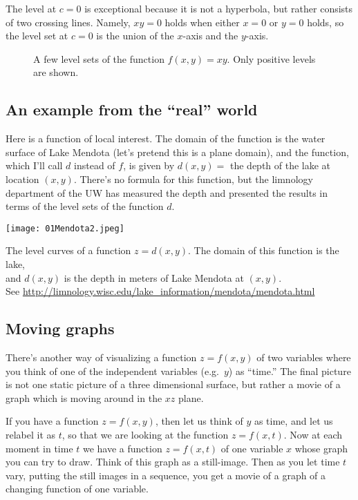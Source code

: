 The level at $c=0$ is exceptional because it is not a hyperbola, but
rather consists of two crossing lines.  Namely, $xy=0$ holds when
either $x=0$ or $y=0$ holds, so the level set at $c=0$ is the union of
the $x$-axis and the $y$-axis.

\begin{figure}[htb]
  \begin{center}
    
  \end{center}
  \caption{A few level sets of the function $f(x, y) = xy$.  Only
  positive levels are shown.  }
  \label{fig:saddlelevels}
\end{figure}


\subsection{An example from the ``real'' world}    %
\label{sec:01mendotaexample}  Here is a function of local interest.
The domain of the function is the water surface of Lake Mendota (let's
pretend this is a plane domain), and the function, which I'll call $d$
instead of $f$, is given by $d(x, y) = $ the depth of the lake at
location $(x, y)$.  There's no formula for this function, but the
limnology department of the UW has measured the depth and presented
the results in terms of the level sets of the function $d$.  


\begin{center}\sffamily
  \texttt{[image: 01Mendota2.jpeg]}
  
  The level curves of a function $z=d(x, y)$.  The domain
  of this function is the lake, \\
  and $d(x, y)$ is the depth in meters of Lake Mendota at $(x, y)$.\\
  See
  \url{http://limnology.wisc.edu/lake_information/mendota/mendota.html}
\end{center}


\subsection{Moving graphs}    %
There's another way of visualizing a function $z=f(x, y)$ of two
variables where you think of one of the independent variables (e.g.\
$y$) as ``time.''  The final picture is not one static picture of a
three dimensional surface, but rather a movie of a graph which is
moving around in the $xz$ plane.

If you have a function $z=f(x, y)$, then let us think of $y$ as time,
and let us relabel it as $t$, so that we are looking at the function
$z=f(x,t)$. Now at each moment in time $t$ we have a function $z=f(x,t)$
of one variable $x$ whose graph you can try to draw. Think of this graph
as a still-image. Then as you let time $t$ vary, putting the still images
in a sequence, you get a movie of a graph of a changing function of one
variable.

